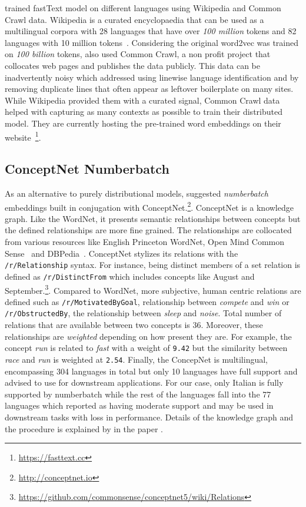 \textcite{grave_learning_2018} trained fastText model on different languages using Wikipedia and Common Crawl data.
Wikipedia is a curated encyclopaedia that can be used as a multilingual corpora with 28 languages that have over \emph{100 million} tokens and 82 languages with 10 million tokens~\cite{grave_learning_2018}.
Considering the original word2vec was trained on \emph{100 billion} tokens, \citeauthor{grave_learning_2018} also used Common Crawl, a non profit project that collocates web pages and publishes the data publicly.
This data can be inadvertently noisy which \citeauthor{grave_learning_2018} addressed using linewise language identification and by removing duplicate lines that often appear as leftover boilerplate on many sites.
While Wikipedia provided them with a curated signal, Common Crawl data helped with capturing as many contexts as possible to train their distributed model.
They are currently hosting the pre-trained word embeddings on their website~\footnote{\url{https://fasttext.cc}}.

\subsection{ConceptNet Numberbatch}%
\label{sub:conceptnet_numberbatch}

As an alternative to purely distributional models, \textcite{speer_conceptnet_2017} suggested \emph{numberbatch} embeddings built in conjugation with ConceptNet.\footnote{\url{http://conceptnet.io}}.
ConceptNet is a knowledge graph.
Like the WordNet, it presents semantic relationships between concepts but the defined relationships are more fine grained.
The relationships are collocated from various resources like English Princeton WordNet, Open Mind Common Sense~\cite{anacleto_can_2006} and DBPedia~\cite{auer_dbpedia_2007}.
ConceptNet stylizes its relations with the \texttt{/r/Relationship} syntax.
For instance, being distinct members of a set relation is defined as \texttt{/r/DistinctFrom} which includes concepts like August and September.\footnote{\url{https://github.com/commonsense/conceptnet5/wiki/Relations}}.
Compared to WordNet, more subjective, human centric relations are defined such as \texttt{/r/MotivatedByGoal}, relationship between \emph{compete} and \emph{win} or \texttt{/r/ObstructedBy}, the relationship between \emph{sleep} and \emph{noise}.
Total number of relations that are available between two concepts is 36.
Moreover, these relationships are \emph{weighted} depending on how present they are.
For example, the concept \emph{run} is related to \emph{fast} with a weight of \texttt{9.42} but the similarity between \emph{race} and \emph{run} is weighted at \texttt{2.54}.
Finally, the ConcepNet is multilingual, encompassing 304 languages in total but only 10 languages have full support and advised to use for downstream applications.
For our case, only Italian is fully supported by numberbatch while the rest of the languages fall into the 77 languages which reported as having moderate support and may be used in downstream tasks with loss in performance.
Details of the knowledge graph and the procedure is explained by \textcite{speer_conceptnet_2017} in the paper .


